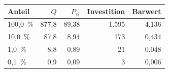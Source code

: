 \begingroup
\setlength{\tabcolsep}{3.5pt}
\begin{tabular*}{\columnwidth}{@{}@{\extracolsep{\fill}}lrrrr@{}}
\toprule
Anteil & \(Q\) & \(P_{el}\) & Investition & Barwert \\
\midrule
100,0~\% & 877,8 & 89,38 & 1.595 & 4,136 \\
10,0~\% & 87,8 & 8,94 & 173 & 0,434 \\
1,0~\% & 8,8 & 0,89 & 21 & 0,048 \\
0,1~\% & 0,9 & 0,09 & 3 & 0,006 \\
\bottomrule
\end{tabular*}
\endgroup
